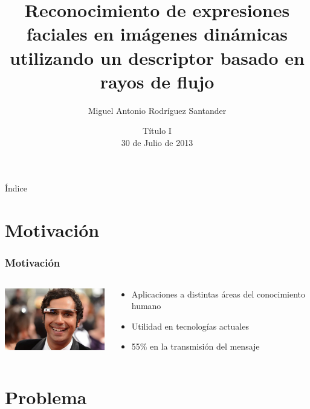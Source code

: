 \documentclass{beamer}
\title{Reconocimiento de expresiones faciales en imágenes dinámicas utilizando un descriptor basado en rayos de flujo}
\author{Miguel Antonio Rodríguez Santander}
\institute[Universidad Diego Portales] %
{%
  Universidad Diego Portales\\
  Facultad de Ingeniería\\
  Escuela de Informática y Telecomunicaciones
  
}
\date{Título I\\ 30 de Julio de 2013}
\begin{document}
\begin{frame}
  \titlepage
\end{frame}

\begin{frame}{Índice}
  \tableofcontents
\end{frame}




\section{Motivación}

\begin{frame}
  \frametitle{Motivación}
  \begin{columns}[onlytextwidth]
    \begin{column}{0.5\textwidth}
      \centering
      \includegraphics[width=5cm]{imagenes/google_glass.jpg}
    \end{column}
    \begin{column}{0.5\textwidth}
        \begin{itemize}
            \item Aplicaciones a distintas áreas del conocimiento humano
            \item Utilidad en tecnologías actuales
            \item 55\% en la transmisión del mensaje
        \end{itemize}
    \end{column}
  \end{columns}
\end{frame}


\section{Problema}
    
\end{document}
